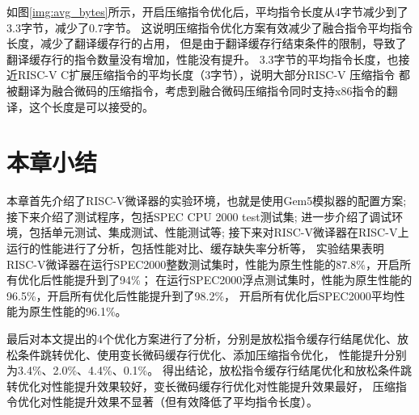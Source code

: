 如图\ref{img:avg_bytes}所示，开启压缩指令优化后，平均指令长度从4字节减少到了3.3字节，减少了0.7字节。
这说明压缩指令优化方案有效减少了融合指令平均指令长度，减少了翻译缓存行的占用，
但是由于翻译缓存行结束条件的限制，导致了翻译缓存行的指令数量没有增加，性能没有提升。
3.3字节的平均指令长度，也接近RISC-V C扩展压缩指令的平均长度（3字节），说明大部分RISC-V 压缩指令
都被翻译为融合微码的压缩指令，考虑到融合微码压缩指令同时支持x86指令的翻译，这个长度是可以接受的。


\section{本章小结}

本章首先介绍了RISC-V微译器的实验环境，也就是使用Gem5模拟器的配置方案;
接下来介绍了测试程序，包括SPEC CPU 2000 test测试集;
进一步介绍了调试环境，包括单元测试、集成测试、性能测试等;
接下来对RISC-V微译器在RISC-V上运行的性能进行了分析，包括性能对比、缓存缺失率分析等，
实验结果表明RISC-V微译器在运行SPEC2000整数测试集时，性能为原生性能的87.8\%，开启所有优化后性能提升到了94\%；
在运行SPEC2000浮点测试集时，性能为原生性能的96.5\%，开启所有优化后性能提升到了98.2\%，
开启所有优化后SPEC2000平均性能为原生性能的96.1\%。

最后对本文提出的4个优化方案进行了分析，分别是放松指令缓存行结尾优化、放松条件跳转优化、使用变长微码缓存行优化、添加压缩指令优化，
性能提升分别为3.4\%、2.0\%、4.4\%、0.1\%。
得出结论，放松指令缓存行结尾优化和放松条件跳转优化对性能提升效果较好，变长微码缓存行优化对性能提升效果最好，
压缩指令优化对性能提升效果不显著（但有效降低了平均指令长度）。